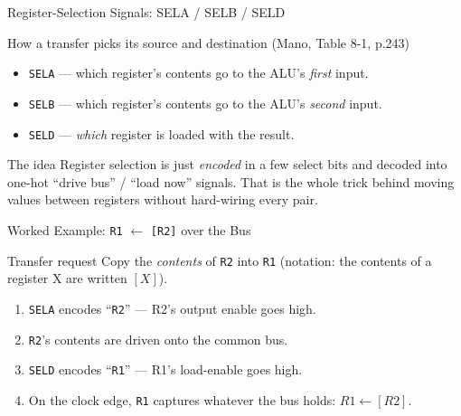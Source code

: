 \documentclass[aspectratio=169]{beamer}
\begin{document}
\begin{frame}{Register-Selection Signals: SELA / SELB / SELD}
  \begin{block}{How a transfer picks its source and destination (Mano, Table 8-1, p.243)}
    \begin{itemize}
      \item \texttt{SELA} --- which register's contents go to the ALU's
        \emph{first} input.
      \item \texttt{SELB} --- which register's contents go to the ALU's
        \emph{second} input.
      \item \texttt{SELD} --- \emph{which} register is loaded with the result.
    \end{itemize}
  \end{block}
  \begin{exampleblock}{The idea}
    Register selection is just \emph{encoded} in a few select bits and decoded
    into one-hot ``drive bus'' / ``load now'' signals. That is the whole trick
    behind moving values between registers without hard-wiring every pair.
  \end{exampleblock}
\end{frame}

\begin{frame}{Worked Example: \texttt{R1} $\gets$ \texttt{[R2]} over the Bus}
  \begin{block}{Transfer request}
    Copy the \emph{contents} of \texttt{R2} into \texttt{R1} (notation: the
    contents of a register X are written $[X]$).
  \end{block}
  \begin{enumerate}
    \item \texttt{SELA} encodes ``\texttt{R2}'' --- R2's output enable goes high.
    \item \texttt{R2}'s contents are driven onto the common bus.
    \item \texttt{SELD} encodes ``\texttt{R1}'' --- R1's load-enable goes high.
    \item On the clock edge, \texttt{R1} captures whatever the bus holds:
      $R1 \gets [R2]$.
  \end{enumerate}
  \vspace{0.2cm}
\end{frame}
\end{document}
